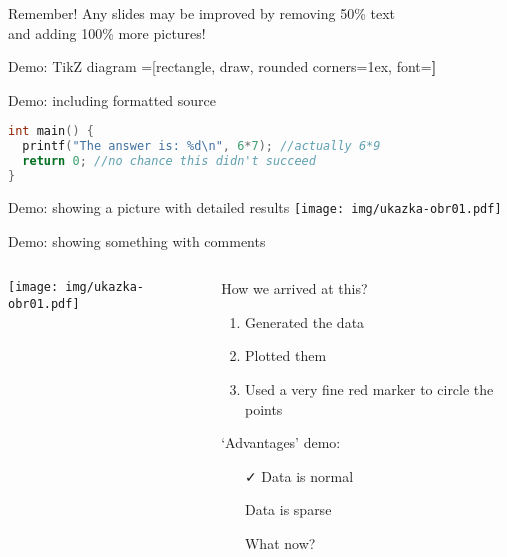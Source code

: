 \documentclass[aspectratio=169]{beamer}
\begin{document}
\begin{frame}[standout]{Remember!}
Any slides may be improved by removing 50\% text \\ and adding 100\% more pictures!
\end{frame}

\begin{frame}{Demo: TikZ diagram}
\centering
{}=[rectangle, draw, rounded corners=1ex, font=\huge\bfseries]
\end{frame}

\begin{frame}[fragile]{Demo: including formatted source}

\begin{lstlisting}[language=C,showstringspaces=false,basicstyle=\tt\small,commentstyle=\color{green!50!black},keywordstyle=\bfseries\color{blue!50!black},stringstyle=\color{red!50!black}]
int main() {
  printf("The answer is: %d\n", 6*7); //actually 6*9
  return 0; //no chance this didn't succeed
}
\end{lstlisting}
\end{frame}

\begin{frame}{Demo: showing a picture with detailed results}
\centering
\texttt{[image: img/ukazka-obr01.pdf]}
\end{frame}

\begin{frame}{Demo: showing something with comments}
\begin{columns}
\begin{column}{0.5\textwidth}
\texttt{[image: img/ukazka-obr01.pdf]}
\end{column}
\begin{column}{0.5\textwidth}
How we arrived at this?
\begin{enumerate}
\item Generated the data
\item Plotted them
\item Used a very fine red marker to circle the points
\end{enumerate}

`Advantages' demo:

\begin{itemize}
\item[\color{green}\faCheck] Data is normal
\item[\color{red}\faTimes] Data is sparse
\item[\color{violet}\faQuestionCircle] What now?
\end{itemize}
\end{column}
\end{columns}
\end{frame}
\end{document}
